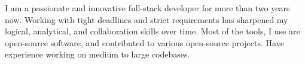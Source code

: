 \documentclass[10pt,a4paper,ragged2e,withhyper]{altacv}
\begin{document}



\makecvheader

\divider

I am a passionate and innovative full-stack developer for more than two years now. Working with tight deadlines and strict requirements has sharpened my logical, analytical, and collaboration skills over time. Most of the tools, I use are open-source software, and contributed to various open-source projects. Have experience working on medium to large codebases.


\end{document}
